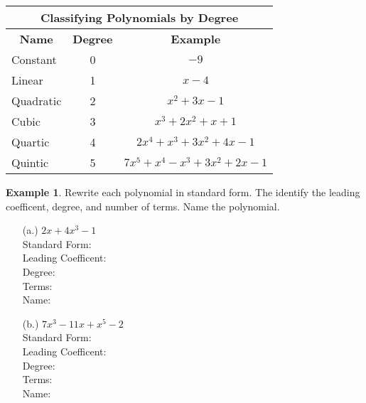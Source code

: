 \documentclass{report}
\theoremstyle{definition}
\newtheorem{example}{\bf Example}
\begin{document}
\begin{center}	
	\begin{tabular}{|l|c|c|}
		\hline
		\multicolumn{3}{|c|}{\textbf{Classifying Polynomials by Degree}}\\
		\hline
		\multicolumn{1}{|c|}{\textbf{Name}} & \textbf{Degree} & \textbf{Example} \\
		\hline
		Constant&0& $-9$\\
		\hline
		Linear&1& $x-4$\\
		\hline
		Quadratic&2& $x^2+3x-1$\\
		\hline
		Cubic&3& $x^3+2x^2+x+1$\\
		\hline
		Quartic&4& $2x^4+x^3+3x^2+4x-1$\\
		\hline
		Quintic&5& $7x^5+x^4-x^3+3x^2+2x-1$\\
		\hline
	\end{tabular}
\end{center}

\begin{example}
Rewrite each polynomial in standard form. The identify the leading coefficent, degree, and number of terms. Name the polynomial.
\end{example}

\begin{minipage}[t]{0.45\linewidth}
\begin{itemize}
\item [(a.)] $2x+4x^3-1$ \vspace{0.25cm}\\
\vspace{0.25cm}
Standard Form:\\
\vspace{0.25cm}
Leading Coefficent:\\
\vspace{0.25cm}
Degree:\\
\vspace{0.25cm}
Terms:\\
\vspace{0.25cm}
Name:\\
\vspace{0.25cm}
\end{itemize}
\end{minipage}
\begin{minipage}[t]{0.45\linewidth}
\begin{itemize}
\item [(b.)] $7x^3-11x+x^5-2$ \vspace{0.25cm}\\
\vspace{0.25cm}
Standard Form:\\
\vspace{0.25cm}
Leading Coefficent:\\
\vspace{0.25cm}
Degree:\\
\vspace{0.25cm}
Terms:\\
\vspace{0.25cm}
Name:\\
\vspace{0.25cm}
\end{itemize}
\end{minipage}
\end{document}
